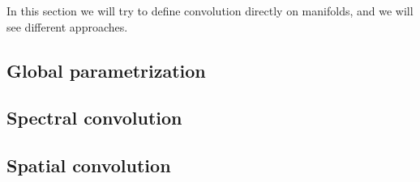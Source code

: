
In this section we will try to define convolution directly on manifolds, and we will see different approaches.

\subsection{Global parametrization} 


\subsection{Spectral convolution} 


\subsection{Spatial convolution} 

